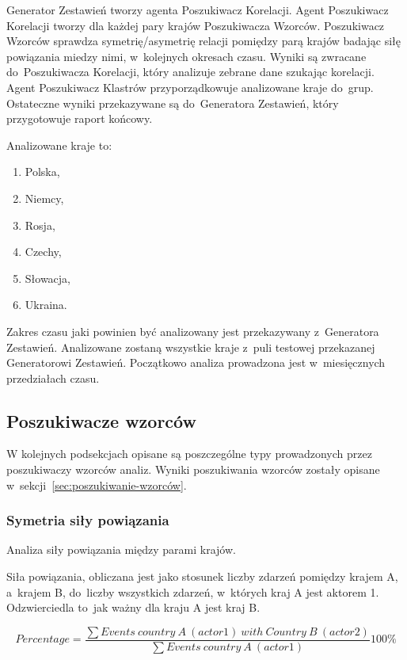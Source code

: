 \documentclass[11pt]{report}
\begin{document}
    Generator Zestawień tworzy agenta Poszukiwacz Korelacji.
    Agent Poszukiwacz Korelacji tworzy dla każdej pary krajów Poszukiwacza Wzorców.
    Poszukiwacz Wzorców sprawdza symetrię/asymetrię relacji pomiędzy parą krajów badając siłę powiązania miedzy nimi, w~kolejnych okresach czasu.
    Wyniki są zwracane do~Poszukiwacza Korelacji, który analizuje zebrane dane szukając korelacji.
    Agent Poszukiwacz Klastrów przyporządkowuje analizowane kraje do~grup.
    Ostateczne wyniki przekazywane są do~Generatora Zestawień, który przygotowuje raport końcowy.

    Analizowane kraje to:
    \begin{enumerate}
        \item Polska,
        \item Niemcy,
        \item Rosja,
        \item Czechy,
        \item Słowacja,
        \item Ukraina.
    \end{enumerate}

    Zakres czasu jaki powinien być analizowany jest przekazywany z~Generatora Zestawień.
    Analizowane zostaną wszystkie kraje z~puli testowej przekazanej Generatorowi Zestawień.
    Początkowo analiza prowadzona jest w~miesięcznych przedziałach czasu.

    \subsection{Poszukiwacze wzorców}
    W kolejnych podsekcjach opisane są poszczególne typy prowadzonych przez poszukiwaczy wzorców analiz.
    Wyniki poszukiwania wzorców zostały opisane w~sekcji~\ref{sec:poszukiwanie-wzorców}.

    \subsubsection{Symetria siły powiązania}
    Analiza siły powiązania między parami krajów.

    Siła powiązania, obliczana jest jako stosunek liczby zdarzeń pomiędzy krajem A, a~krajem B, do~liczby wszystkich zdarzeń, w~których kraj A jest aktorem 1.
    Odzwierciedla to~jak ważny dla kraju A jest kraj B\@.


    \[ Percentage = \frac
    {\sum{Events\ country\ A\ (actor 1)\ with\ Country\ B\ (actor 2)}}
    {\sum{Events\ country\ A\ (actor 1)}}
    100 \%
    \]
\end{document}
